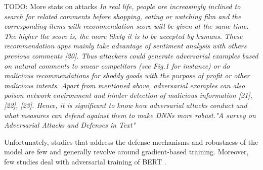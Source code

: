 \documentclass[%
	BCOR=8mm, %
	DIV=12, 
	toc=bibliography, %
	toc=listof, %
	oneside, %
	egregdoesnotlikesansseriftitles, %
	]{scrbook}
\begin{document}
TODO: More stats on attacks 
\textit{In real life, people are increasingly inclined to search for related comments before shopping, eating or watching film and the corresponding items with recommendation score will be given at the same time. The higher the score is, the more likely it is to be accepted by humans. These recommendation apps mainly take advantage of sentiment analysis with others previous comments [20]. Thus attackers could generate adversarial examples based on natural comments to smear competitors (see Fig.1 for instance) or do malicious recommendations for shoddy goods with the purpose of profit or other malicious intents. Apart from mentioned above, adversarial examples can also poison network environment and hinder detection of malicious information [21], [22], [23]. Hence, it is significant to know how adversarial attacks conduct and what measures can defend against them to make DNNs more robust."A survey on Adversarial Attacks and Defenses in Text"}

Unfortunately, studies that address the defense mechanisms and robustness of the model are few and generally revolve around gradient-based training. Moreover, few studies deal with adversarial training of BERT \cite{zhu_at-bert_2021,du_adversarial_2020}. 
\end{document}
